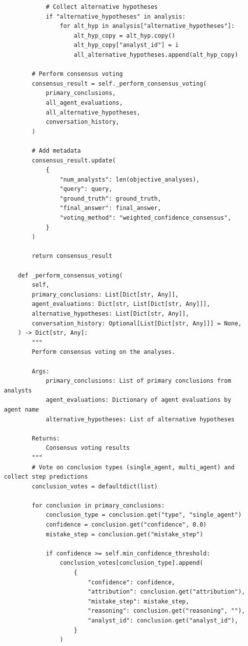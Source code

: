 \documentclass{article}
\begin{document}
\begin{lstlisting}
            # Collect alternative hypotheses
            if "alternative_hypotheses" in analysis:
                for alt_hyp in analysis["alternative_hypotheses"]:
                    alt_hyp_copy = alt_hyp.copy()
                    alt_hyp_copy["analyst_id"] = i
                    all_alternative_hypotheses.append(alt_hyp_copy)

        # Perform consensus voting
        consensus_result = self._perform_consensus_voting(
            primary_conclusions,
            all_agent_evaluations,
            all_alternative_hypotheses,
            conversation_history,
        )

        # Add metadata
        consensus_result.update(
            {
                "num_analysts": len(objective_analyses),
                "query": query,
                "ground_truth": ground_truth,
                "final_answer": final_answer,
                "voting_method": "weighted_confidence_consensus",
            }
        )

        return consensus_result

    def _perform_consensus_voting(
        self,
        primary_conclusions: List[Dict[str, Any]],
        agent_evaluations: Dict[str, List[Dict[str, Any]]],
        alternative_hypotheses: List[Dict[str, Any]],
        conversation_history: Optional[List[Dict[str, Any]]] = None,
    ) -> Dict[str, Any]:
        """
        Perform consensus voting on the analyses.

        Args:
            primary_conclusions: List of primary conclusions from analysts
            agent_evaluations: Dictionary of agent evaluations by agent name
            alternative_hypotheses: List of alternative hypotheses

        Returns:
            Consensus voting results
        """
        # Vote on conclusion types (single_agent, multi_agent) and collect step predictions
        conclusion_votes = defaultdict(list)

        for conclusion in primary_conclusions:
            conclusion_type = conclusion.get("type", "single_agent")
            confidence = conclusion.get("confidence", 0.0)
            mistake_step = conclusion.get("mistake_step")

            if confidence >= self.min_confidence_threshold:
                conclusion_votes[conclusion_type].append(
                    {
                        "confidence": confidence,
                        "attribution": conclusion.get("attribution"),
                        "mistake_step": mistake_step,
                        "reasoning": conclusion.get("reasoning", ""),
                        "analyst_id": conclusion.get("analyst_id"),
                    }
                )


\end{lstlisting}
\end{document}

